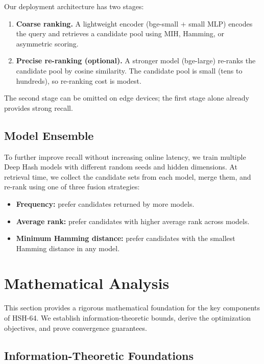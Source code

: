 \documentclass[11pt,a4paper]{article}
\begin{document}
Our deployment architecture has two stages:
\begin{enumerate}[leftmargin=*]
    \item \textbf{Coarse ranking.} A lightweight encoder (bge-small + small MLP) encodes the query and retrieves a candidate pool using MIH, Hamming, or asymmetric scoring.
    \item \textbf{Precise re-ranking (optional).} A stronger model (bge-large) re-ranks the candidate pool by cosine similarity. The candidate pool is small (tens to hundreds), so re-ranking cost is modest.
\end{enumerate}
The second stage can be omitted on edge devices; the first stage alone already provides strong recall.

\subsection{Model Ensemble}

To further improve recall without increasing online latency, we train multiple Deep Hash models with different random seeds and hidden dimensions. At retrieval time, we collect the candidate sets from each model, merge them, and re-rank using one of three fusion strategies:
\begin{itemize}[leftmargin=*]
    \item \textbf{Frequency:} prefer candidates returned by more models.
    \item \textbf{Average rank:} prefer candidates with higher average rank across models.
    \item \textbf{Minimum Hamming distance:} prefer candidates with the smallest Hamming distance in any model.
\end{itemize}

\section{Mathematical Analysis}
\label{sec:math-analysis}

This section provides a rigorous mathematical foundation for the key components of HSH-64. We establish information-theoretic bounds, derive the optimization objectives, and prove convergence guarantees.

\subsection{Information-Theoretic Foundations}
\end{document}
